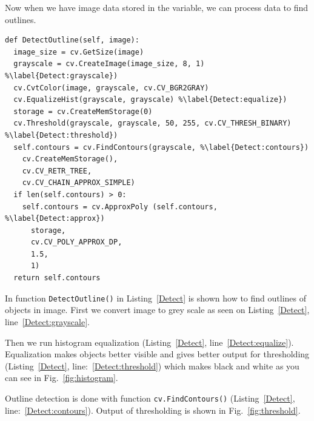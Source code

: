 \documentclass{ifacconf}
\begin{document}
Now when we have image data stored in the variable, we can process data to find
outlines.

\begin{lstlisting}[caption=Outline detection, label=Detect]
def DetectOutline(self, image):
  image_size = cv.GetSize(image)
  grayscale = cv.CreateImage(image_size, 8, 1)	%\label{Detect:grayscale})
  cv.CvtColor(image, grayscale, cv.CV_BGR2GRAY)
  cv.EqualizeHist(grayscale, grayscale)	%\label{Detect:equalize})
  storage = cv.CreateMemStorage(0)
  cv.Threshold(grayscale, grayscale, 50, 255, cv.CV_THRESH_BINARY) %\label{Detect:threshold})
  self.contours = cv.FindContours(grayscale, %\label{Detect:contours})
    cv.CreateMemStorage(),
    cv.CV_RETR_TREE,
    cv.CV_CHAIN_APPROX_SIMPLE)
  if len(self.contours) > 0:
    self.contours = cv.ApproxPoly (self.contours, %\label{Detect:approx})
      storage,
      cv.CV_POLY_APPROX_DP,
      1.5,
      1)
  return self.contours
\end{lstlisting}

In function \lstinline{DetectOutline()} in Listing~\ref{Detect} is shown how to
find outlines of objects in image.
First we convert image to grey scale as seen on Listing~\ref{Detect},
line~\ref{Detect:grayscale}.

Then we run histogram equalization (Listing~\ref{Detect},
line~\ref{Detect:equalize}). Equalization makes objects better visible and gives
better output for thresholding (Listing~\ref{Detect},
line:~\ref{Detect:threshold}) which makes black and white as you can see in
Fig.~\ref{fig:histogram}.

Outline detection is done with function
\lstinline{cv.FindContours()} (Listing~\ref{Detect},
line:~\ref{Detect:contours}). Output of thresholding is shown in
Fig.~\ref{fig:threshold}.
\end{document}

